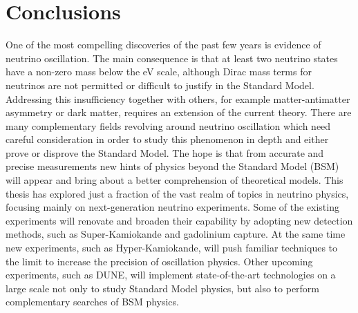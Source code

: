 \clearpage
\chapter{Conclusions}
\label{sec:conclusions}

One of the most compelling discoveries of the past few years is evidence of neutrino oscillation.
The main consequence is that at least two neutrino states have %
a non-zero mass below the eV scale, although Dirac mass terms for neutrinos are not permitted or difficult to justify %
in the Standard Model.
Addressing this insufficiency together with others, for example matter-antimatter asymmetry or dark matter, %
requires an extension of the current theory.
There are many complementary fields revolving around neutrino oscillation %
which need careful consideration in order to study this phenomenon in depth and either prove or disprove the Standard Model.
The hope is that from accurate and precise measurements new hints of physics beyond the Standard Model (BSM) will appear %
and bring about a better comprehension of theoretical models.
This thesis has explored just a fraction of the vast realm of topics in neutrino physics, %
focusing mainly on next-generation neutrino experiments.
Some of the existing experiments will renovate and broaden their capability %
by adopting new detection methods, such as Super-Kamiokande and gadolinium capture.
At the same time new experiments, such as Hyper-Kamiokande, will %
push familiar techniques to the limit to increase the precision of oscillation physics.
Other upcoming experiments, such as DUNE, will implement state-of-the-art technologies on a large scale %
not only to study Standard Model physics, but also to perform complementary searches of BSM physics.

